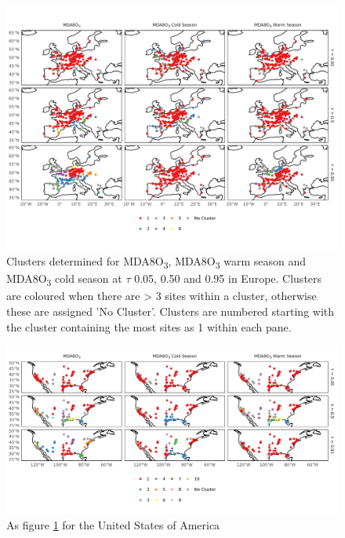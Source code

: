 \documentclass[journal abbreviation, manuscript]{copernicus}
\begin{document}
\begin{figure}
    \centering
    \includegraphics[width=\textwidth]{figures/paper_figures/f07_eu_clusters.pdf}
    \caption{Clusters determined for MDA8O\textsubscript{3}, MDA8O\textsubscript{3} warm season and MDA8O\textsubscript{3} cold season at $\tau$ 0.05, 0.50 and 0.95 in Europe. Clusters are coloured when there are > 3 sites within a cluster, otherwise these are assigned 'No Cluster'. Clusters are numbered starting with the cluster containing the most sites as 1 within each pane.}
    \label{fig:eu_cluster}
\end{figure}

\clearpage

\begin{figure}
    \centering
    \includegraphics[width=\textwidth]{figures/paper_figures/f08_us_clusters.pdf}
    \caption{As figure \ref{fig:eu_cluster} for the United States of America}
    \label{fig:us_cluster}
\end{figure}
\end{document}
